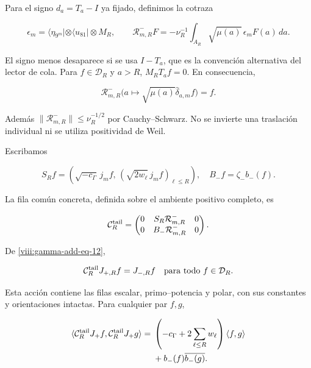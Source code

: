 Para el signo \(d_a=T_a-I\) ya fijado, definimos la cotraza

\begin{equation}
\epsilon_m=\langle\eta_{9^m}|\otimes\langle u_{81}|\otimes M_R,
\qquad
\mathcal R^-_{m,R}F
=-\nu_R^{-1}\int_{A_R}\sqrt{\mu(a)}\,\epsilon_m F(a)\,da.
\label{viii:gamma-add-eq-11}
\end{equation}

El signo menos desaparece si se usa \(I-T_a\), que es la convención alternativa del lector de cola. Para \(f\in\mathcal D_R\) y \(a>R\), \(M_RT_af=0\). En consecuencia,

\begin{equation}
\mathcal R^-_{m,R}
\bigl(a\mapsto\sqrt{\mu(a)}\widehat\delta_{a,m}f\bigr)=f.
\label{viii:gamma-add-eq-12}
\end{equation}
\label{viii:gamma-add:cola-lector}

Además \(\|\mathcal R^-_{m,R}\|\le\nu_R^{-1/2}\) por Cauchy--Schwarz. No se invierte una traslación individual ni se utiliza positividad de Weil.

Escribamos

\begin{equation}
S_Rf=\left(\sqrt{-c_\Gamma}\,j_mf,\,
              (\sqrt{2w_\ell}\,j_mf)_{\ell\le R}\right),
\quad B_-f=\zeta_-b_-(f).
\label{viii:gamma-add-display-28}
\end{equation}

La fila común concreta, definida sobre el ambiente positivo completo, es

\begin{equation}
\mathcal C_R^{\rm tail}
=
\begin{pmatrix}
0&S_R\mathcal R^-_{m,R}&0\\
0&B_-\mathcal R^-_{m,R}&0
\end{pmatrix}.
\label{viii:gamma-add-eq-13}
\end{equation}

De \eqref{viii:gamma-add-eq-12},

\begin{equation}
\mathcal C_R^{\rm tail}J_{+,R}f=J_{-,R}f
\quad\hbox{para todo }f\in\mathcal D_R.
\label{viii:gamma-add-eq-14}
\end{equation}

Esta acción contiene las filas escalar, primo--potencia y polar, con sus constantes y orientaciones intactas. Para cualquier par \(f,g\),

\begin{equation}
\begin{aligned}
\langle\mathcal C_R^{\rm tail}J_+f,\mathcal C_R^{\rm tail}J_+g\rangle
={}&\left(-c_\Gamma+2\sum_{\ell\le R}w_\ell\right)\langle f,g\rangle\\
&+b_-(f)\overline{b_-(g)}.
\end{aligned}
\label{viii:gamma-add-eq-15}
\end{equation}

